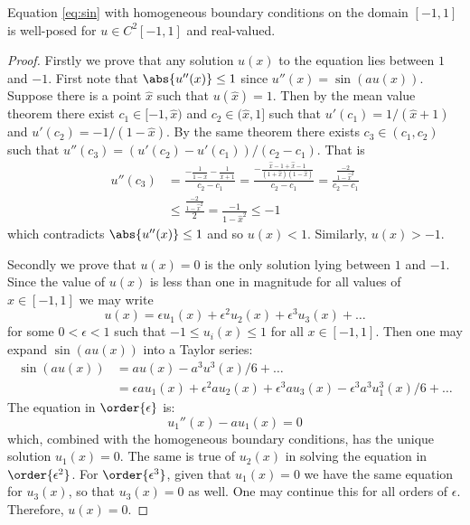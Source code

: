 \documentclass{article}
\begin{document}
\begin{lemma}[Wellposedness]
Equation \ref{eq:sin} with homogeneous boundary conditions on the domain $[-1,1]$ is well-posed for $u \in C^2[-1,1]$ and real-valued.
\end{lemma}

\begin{proof}
Firstly we prove that any solution $u(x)$ to the equation lies between $1$ and $-1$.
First note that $\abs{u''(x)} \leq 1$ since $u''(x) = \sin(au(x))$.
Suppose there is a point $\hat{x}$ such that $u(\hat{x}) = 1$.
Then by the mean value theorem there exist $c_1 \in [-1,\hat{x})$ and $c_2 \in (\hat{x}, 1]$ such that
$u'(c_1) = 1 / (\hat{x} + 1)$
and
$u'(c_2) = -1 / (1 - \hat{x})$.
By the same theorem there exists $c_3 \in (c_1,c_2)$ such that
$u''(c_3) = (u'(c_2) - u'(c_1)) / (c_2 - c_1)$.
That is
\begin{align*}
u''(c_3) & = \frac{ -\frac{1}{1 - \hat{x}} - \frac{1}{\hat{x}+1} }{c_2 - c_1}
		  = \frac{ -\frac{ \hat{x} - 1 + \hat{x} - 1}{(1+\hat{x})(1-\hat{x})} }{c_2 - c_1}
		  = \frac{ \frac{-2}{1 - \hat{x}^2} }{c_2 - c_1} \\
		 & \leq \frac{ \frac{-2}{1 - \hat{x}^2} }{2} = \frac{-1}{1 - \hat{x}^2} \leq -1
\end{align*}
which contradicts $\abs{u''(x)} \leq 1$ and so $u(x) < 1$.
Similarly, $u(x) > -1$.

Secondly we prove that $u(x) = 0$ is the only solution lying between $1$ and $-1$.
Since the value of $u(x)$ is less than one in magnitude for all values of $x \in [-1,1]$ we may write
\begin{equation*}
u(x) = \epsilon u_1(x) + \epsilon^2 u_2(x) + \epsilon^3 u_3(x) + \dots
\end{equation*}
for some $0 < \epsilon < 1$ such that $-1 \leq u_i(x) \leq 1$ for all $x \in [-1,1]$.
Then one may expand $\sin(au(x))$ into a Taylor series:
\begin{align*}
\sin(au(x)) & = au(x) - a^3 u^3(x) / 6 + \dots \\
			& = \epsilon a u_1(x) + \epsilon^2 a u_2(x) + \epsilon^3 a u_3(x) - \epsilon^3 a^3 u_1^3(x)/6 + \dots
\end{align*}
The equation in $\order{\epsilon}$ is:
\begin{equation*}
u_1''(x) - au_1(x) = 0
\end{equation*}
which, combined with the homogeneous boundary conditions, has the unique solution $u_1(x) = 0$.
The same is true of $u_2(x)$ in solving the equation in $\order{\epsilon^2}$.
For $\order{\epsilon^3}$, given that $u_1(x) = 0$ we have the same equation for $u_3(x)$, so that $u_3(x) = 0$ as well.
One may continue this for all orders of $\epsilon$.
Therefore, $u(x) = 0$.
\end{proof}
\end{document}
